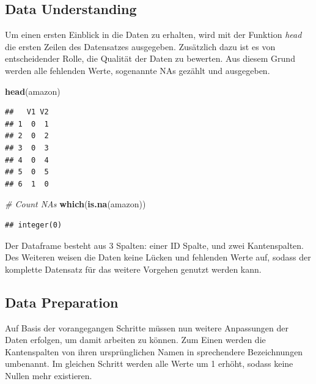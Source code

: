 \documentclass[
  12 pt,
]{article}
\newenvironment{Shaded}{\begin{snugshade}}{\end{snugshade}}
\newcommand{\CommentTok}[1]{\textcolor[rgb]{0.56,0.35,0.01}{\textit{#1}}}
\newcommand{\KeywordTok}[1]{\textcolor[rgb]{0.13,0.29,0.53}{\textbf{#1}}}
\newcommand{\NormalTok}[1]{#1}
\begin{document}
\hypertarget{data-understanding}{%
\subsection{Data Understanding}\label{data-understanding}}

Um einen ersten Einblick in die Daten zu erhalten, wird mit der Funktion
\textit{head} die ersten Zeilen des Datensatzes ausgegeben. Zusätzlich
dazu ist es von entscheidender Rolle, die Qualität der Daten zu
bewerten. Aus diesem Grund werden alle fehlenden Werte, sogenannte NAs
gezählt und ausgegeben.\\

\begin{Shaded}
\begin{Highlighting}[]
\KeywordTok{head}\NormalTok{(amazon)}
\end{Highlighting}
\end{Shaded}

\begin{verbatim}
##   V1 V2
## 1  0  1
## 2  0  2
## 3  0  3
## 4  0  4
## 5  0  5
## 6  1  0
\end{verbatim}

\begin{Shaded}
\begin{Highlighting}[]
\CommentTok{# Count NAs}
\KeywordTok{which}\NormalTok{(}\KeywordTok{is.na}\NormalTok{(amazon))}
\end{Highlighting}
\end{Shaded}

\begin{verbatim}
## integer(0)
\end{verbatim}

Der Dataframe besteht aus 3 Spalten: einer ID Spalte, und zwei
Kantenspalten. Des Weiteren weisen die Daten keine Lücken und fehlenden
Werte auf, sodass der komplette Datensatz für das weitere Vorgehen
genutzt werden kann.

\hypertarget{data-preparation}{%
\subsection{Data Preparation}\label{data-preparation}}

Auf Basis der vorangegangen Schritte müssen nun weitere Anpassungen der
Daten erfolgen, um damit arbeiten zu können. Zum Einen werden die
Kantenspalten von ihren ursprünglichen Namen in sprechendere
Bezeichnungen umbenannt. Im gleichen Schritt werden alle Werte um 1
erhöht, sodass keine Nullen mehr existieren.\\
\end{document}
